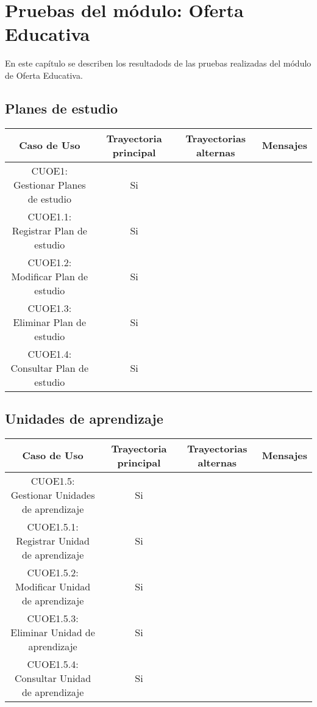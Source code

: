 \newpage

\section{Pruebas del módulo: Oferta Educativa} \label{chp:pruebasAcademias}
En este capítulo se describen los resultadods de las pruebas realizadas del módulo de Oferta Educativa.

\subsection{Planes de estudio}
\begin{center}
	\begin{tabular}{ |c|c|c|c| } 
		\hline
		Caso de Uso & Trayectoria principal & Trayectorias alternas & Mensajes \\
		\hline 
		CUOE1: Gestionar Planes de estudio & Si &  & \\ 
		CUOE1.1: Registrar Plan de estudio & Si &  & \\ 
		CUOE1.2: Modificar Plan de estudio & Si &  & \\ 
		CUOE1.3: Eliminar Plan de estudio & Si &  & \\ 
		CUOE1.4: Consultar Plan de estudio & Si &  & \\ 
		\hline
	\end{tabular}
\end{center}

\subsection{Unidades de aprendizaje}
\begin{center}
	\begin{tabular}{ |c|c|c|c| } 
		\hline
		Caso de Uso & Trayectoria principal & Trayectorias alternas & Mensajes \\
		\hline 
		CUOE1.5: Gestionar Unidades de aprendizaje & Si &  & \\ 
		CUOE1.5.1: Registrar Unidad de aprendizaje & Si &  & \\ 
		CUOE1.5.2: Modificar Unidad de aprendizaje & Si &  & \\ 
		CUOE1.5.3: Eliminar Unidad de aprendizaje & Si &  & \\ 
		CUOE1.5.4: Consultar Unidad de aprendizaje & Si &  & \\ 
		\hline
	\end{tabular}
\end{center}
